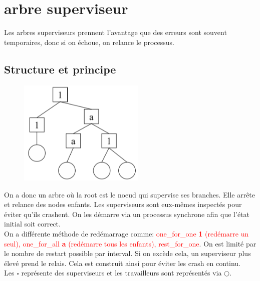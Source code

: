 \documentclass{report}
\begin{document}
\section{arbre superviseur}
Les arbres superviseurs prennent l'avantage que des erreurs sont souvent temporaires, donc si on échoue, on relance le processus.

\subsection{Structure et principe}
\begin{figure}
\centering
\includegraphics[width=6cm]{img/hierarchies.png}
\end{figure}
On a donc un arbre où la root est le noeud qui supervise ses branches. Elle arrête et relance des nodes enfants. Les superviseurs sont eux-mêmes inspectés pour éviter qu'ils crashent. On les démarre via un processus synchrone afin que l'état initial soit correct.\\
On a différente méthode de redémarrage comme: \textcolor{red}{one\_for\_one \textbf{1} (redémarre un seul), one\_for\_all \textbf{a} (redémarre tous les enfants), rest\_for\_one}. On est limité par le nombre de restart possible par interval. Si on excède cela, un superviseur plus élevé prend le relais. Cela est construit ainsi pour éviter les crash en continu.\\
Les $\square$ représente des superviseurs et les travailleurs sont représentés via $\bigcirc$.
\end{document}
